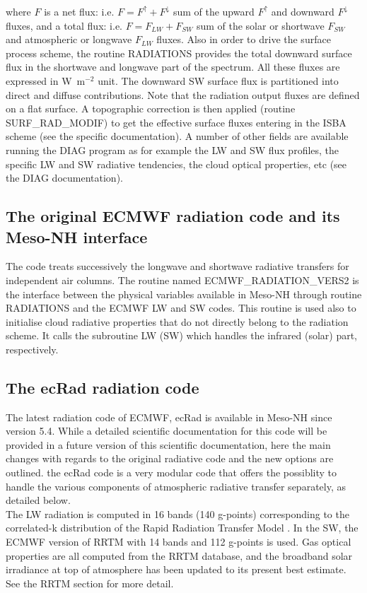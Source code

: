 \noindent where $F$ is a net flux: i.e. $F = F^{\!\uparrow} + F^{\!\downarrow}$
sum of the upward $F^{\!\uparrow}$ and downward $F^{\!\downarrow}$ fluxes,
and a total flux: i.e. $F = F_{LW} + F_{SW}$ sum of the solar or
shortwave $F_{SW}$ and atmospheric or longwave $F_{LW}$ fluxes. Also in order
to drive the surface process scheme, the routine RADIATIONS provides the
total downward surface flux in the shortwave and longwave 
part of the spectrum. All these fluxes are expressed in W~m$^{-2}$ unit.
The downward SW surface flux is partitioned into direct and diffuse contributions. Note that the radiation output fluxes are defined on a flat surface. A topographic correction is then applied (routine SURF\_RAD\_MODIF) to get the effective surface fluxes entering in the ISBA scheme (see the specific documentation). A number of other fields are available running the DIAG program as for example the LW and SW flux profiles, the specific LW and SW radiative tendencies, the cloud optical properties, etc (see the DIAG documentation).\\
%
\subsection{The original ECMWF radiation code and its Meso-NH interface}
%
The code treats successively the longwave and shortwave radiative transfers for independent air columns. The routine named ECMWF\_RADIATION\_VERS2 is the interface between the physical variables available in Meso-NH through routine RADIATIONS and the ECMWF LW and SW codes. This routine is used also to initialise cloud radiative properties that do not directly belong to the radiation scheme. It calls the subroutine LW (SW) which handles the infrared (solar) part, respectively.
%
\subsection{The ecRad radiation code}
%
The latest radiation code of ECMWF, ecRad \citep{Hogan2016b} is available in Meso-NH since version 5.4. While a detailed scientific documentation for this code will be provided in a future version of this scientific documentation, here the main changes with regards to the original radiative code and the new options are outlined. the ecRad code is a very modular code that offers the possiblity to handle the various components of atmospheric radiative transfer separately, as detailed below.\\

The LW radiation is computed in 16 bands (140 g-points) corresponding to the correlated-k distribution of the Rapid Radiation Transfer Model \citep[RRTM,][]{Mlawer1997}. In the SW, the ECMWF version of RRTM \citep{Morcrette2008} with 14 bands and 112 g-points is used. Gas optical properties are all computed from the RRTM database, and the broadband solar irradiance at top of atmosphere has been updated to its present best estimate. See the RRTM section for more detail.\\

